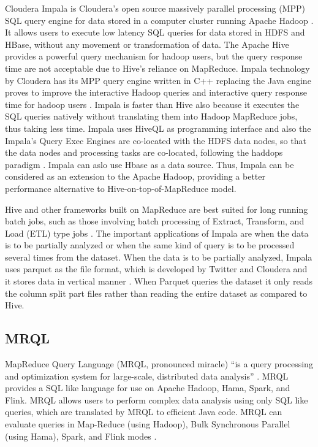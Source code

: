      Cloudera Impala is Cloudera's open source massively parallel
     processing (MPP) SQL query engine for data stored in a computer
     cluster running Apache Hadoop \cite{www-impala-cloudera}. It
     allows users to execute low latency SQL queries for data stored
     in HDFS and HBase, without any movement or transformation of
     data. The Apache Hive provides a powerful query mechanism for
     hadoop users, but the query response time are not acceptable due
     to Hive's reliance on MapReduce. Impala technology by Cloudera
     has its MPP query engine written in C++ replacing the Java engine
     proves to improve the interactive Hadoop queries and interactive
     query response time for hadoop users \cite{www-impala-dummies}
     . Impala is faster than Hive also because it executes the SQL
     queries natively without translating them into Hadoop MapReduce
     jobs, thus taking less time. Impala uses HiveQL as programming
     interface and also the Impala's Query Exec Engines are co-located
     with the HDFS data nodes, so that the data nodes and processing
     tasks are co-located, following the haddops paradigm
     \cite{www-impala-dummies}.  Impala can aslo use Hbase as a data
     source. Thus, Impala can be considered as an extension to the
     Apache Hadoop, providing a better performance alternative to
     Hive-on-top-of-MapReduce model.

     Hive and other frameworks built on MapReduce are best suited for
     long running batch jobs, such as those involving batch processing
     of Extract, Transform, and Load (ETL) type jobs
     \cite{www-impala-cloudera}.  The important applications of
     Impala are when the data is to be partially analyzed or when the
     same kind of query is to be processed several times from the
     dataset. When the data is to be partially analyzed, Impala uses
     parquet as the file format, which is developed by Twitter and
     Cloudera and it stores data in vertical manner
     \cite{www-impala-beginner}. When Parquet queries the dataset it
     only reads the column split part files rather than reading the
     entire dataset as compared to Hive.
     
\subsection{ MRQL}

     MapReduce Query Language (MRQL, pronounced miracle) ``is a query
     processing and optimization system for large-scale, distributed
     data analysis'' \cite{www-apachemrql}. MRQL provides a SQL
     like language for use on Apache Hadoop, Hama, Spark, and Flink.
     MRQL allows users to perform complex data analysis using only SQL
     like queries, which are translated by MRQL to efficient Java
     code. MRQL can evaluate queries in Map-Reduce (using Hadoop), Bulk
     Synchronous Parallel (using Hama), Spark, and Flink modes
     \cite{www-apachemrql}.


